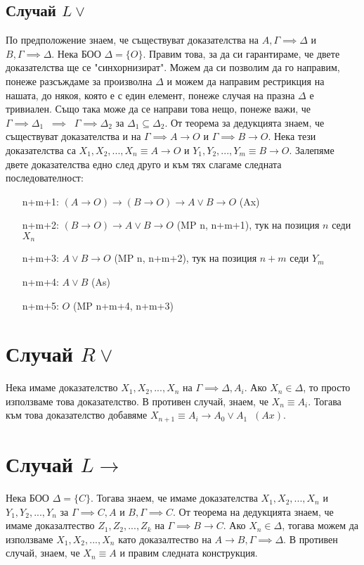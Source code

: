 \documentclass[12pt]{article}
\begin{document}
\subsection*{Случай $L \lor$}
По предположение знаем, че съществуват доказателства на $A, \Gamma \implies \Delta$ и $B, \Gamma \implies \Delta$. Нека БОО $\Delta = \{ O \}$. Правим това, за да си гарантираме, че двете доказателства ще се "синхорнизират". Можем да си позволим да го направим, понеже разсъждаме за произволна $\Delta$ и можем да направим рестрикция на нашата, до някоя, която е с един елемент, понеже случая на празна $\Delta$ е тривиален. Също така може да се направи това нещо, понеже важи, че $\Gamma \implies \Delta_1 \; \; \implies \; \; \Gamma \implies \Delta_2$ за $\Delta_1 \subseteq \Delta_2$. От теорема за дедукцията знаем, че съществуват доказателства и на $\Gamma \implies A \rightarrow O$ и $\Gamma \implies B \rightarrow O$. Нека тези доказателства са $X_1, X_2, ..., X_n \equiv A \rightarrow O$ и $Y_1, Y_2, ..., Y_m \equiv B \rightarrow O$. Залепяме двете доказателства едно след друго и към тях слагаме следната последователност:
\begin{itemize}[itemindent=4em]
    \item[n+m+1: ] $ (A \rightarrow O) \rightarrow (B \rightarrow O) \rightarrow A \lor B \rightarrow O $ (Ax)    
    \item[n+m+2: ] $(B \rightarrow O) \rightarrow A \lor B \rightarrow O$ (MP n, n+m+1), тук на позиция $n$ седи $X_n$ 
    \item[n+m+3: ] $A \lor B \rightarrow O$ (MP n, n+m+2), тук на позиция $n+m$ седи $Y_m$ 
    \item[n+m+4: ] $ A \lor B $ (As) 
    \item[n+m+5: ] $O$ (MP n+m+4, n+m+3)
\end{itemize}

\section*{Случай $R \lor$}
Нека имаме доказателство $X_1, X_2, ..., X_n$ на $\Gamma \implies \Delta, A_i$. Ако $X_n \in \Delta$, то просто използваме това доказателство. В противен случай, знаем, че $X_n \equiv A_i$. Тогава към това доказателство добавяме $X_{n+1} \equiv A_i \rightarrow A_0 \lor A_1 \; \; (Ax)$. 

\section*{Случай $L \rightarrow$}
Нека БОО $\Delta = \{ C \}$. Тогава знаем, че имаме доказателства $X_1, X_2, ..., X_n$ и $Y_1, Y_2, ..., Y_n$ за $\Gamma \implies C, A$ и $B, \Gamma \implies C$. От теорема на дедукцията знаем, че имаме доказалтество $Z_1, Z_2, ..., Z_k$ на $\Gamma \implies B \rightarrow C$. Ако $X_n \in \Delta$, тогава можем да използваме $X_1, X_2, ..., X_n$ като доказалтество на $A \rightarrow B, \Gamma \implies \Delta$. В противен случай, знаем, че $X_n \equiv A$ и правим следната конструкция.  
\end{document}
